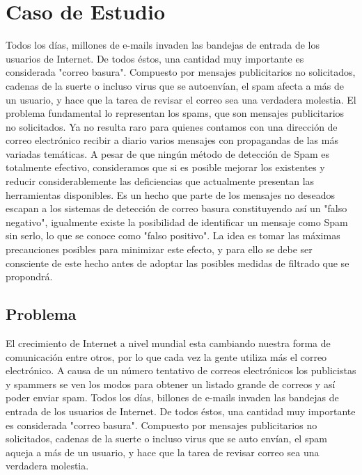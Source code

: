 \documentclass[12pt]{article}
\begin{document}
\section{Caso de Estudio}
Todos los días, millones de e-mails invaden las bandejas de entrada de los usuarios de Internet. De todos éstos, una cantidad muy importante es considerada "correo basura". Compuesto por mensajes publicitarios no solicitados, cadenas de la suerte o incluso virus que se autoenvían, el spam afecta a más de un usuario, y
hace que la tarea de revisar el correo sea una verdadera molestia.
El problema fundamental lo representan los spams, que son mensajes publicitarios no solicitados. Ya no resulta raro para quienes contamos con una
dirección de correo electrónico recibir a diario varios mensajes con propagandas de las más variadas temáticas. A pesar de que ningún método de detección de Spam es totalmente efectivo, consideramos que si es posible mejorar los existentes y reducir considerablemente las deficiencias que actualmente presentan las herramientas disponibles. Es un hecho que parte de los mensajes no deseados escapan a los sistemas de detección de correo basura constituyendo así un "falso negativo", igualmente existe la posibilidad de identificar un mensaje como Spam sin serlo, lo que se conoce como "falso positivo". La idea es tomar las máximas precauciones posibles para minimizar este efecto, y para ello se debe ser consciente de este hecho antes de adoptar las posibles medidas de filtrado que se propondrá.\cite{emailspam}
\subsection{Problema}
El crecimiento de Internet a nivel mundial esta cambiando nuestra forma de comunicación entre otros, por lo que cada vez la gente utiliza más el correo electrónico. A causa de un número tentativo de correos electrónicos los publicistas y spammers se ven los modos para obtener un listado grande de correos y así poder enviar spam. Todos los días, billones de e-mails invaden las bandejas de entrada de los usuarios de Internet. De todos éstos, una cantidad muy importante es considerada "correo basura". Compuesto por mensajes publicitarios no solicitados, cadenas de la suerte o incluso virus que se auto envían, el spam aqueja a más de un usuario, y hace que la tarea de revisar correo sea una verdadera molestia.\cite{emailspam}
\end{document}
